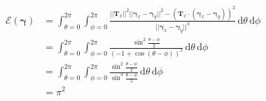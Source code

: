 \documentclass{beamer}
\theoremstyle{remark}
\newcommand{\gammabf}{\boldsymbol{\gamma}}
\newcommand{\intd}{\, \text{d}}
\newcommand{\norm}[1]{\lvert \lvert #1 \rvert \rvert}
\begin{document}

\begin{frame}
    \begin{example}
        \begin{align}
            \mathcal{E} \left( \gammabf \right) &= \int_{\theta=0}^{2 \pi} \int_{\phi=0}^{2 \pi}
            \frac{\norm{\mathbf{T}_x}^2 \norm{\gammabf_x - \gammabf_y}^2 - \left( \mathbf{T}_x \cdot \left( \gammabf_x -\gammabf_y \right) \right)^2}{\norm{\gammabf_x - \gammabf_y}^4} \intd \theta \intd \phi \\
            &= \int_{\theta=0}^{2 \pi} \int_{\phi=0}^{2 \pi}
            \frac{\sin^2 \frac{\theta - \phi}{2}}{\left( -1 + \cos \left( \theta - \phi \right) \right)^2} \intd \theta \intd \phi \\
            &= \int_{\theta=0}^{2 \pi} \int_{\phi=0}^{2 \pi}
            \frac{\sin^2 \frac{\theta - \phi}{2}}{\sin^4 \frac{\theta - \phi}{2}} \intd \theta \intd \phi
            \label{equ: 1 over r squared order}
            \\
            &= \pi^2
        \end{align}
    \end{example}
\end{frame}
\end{document}
